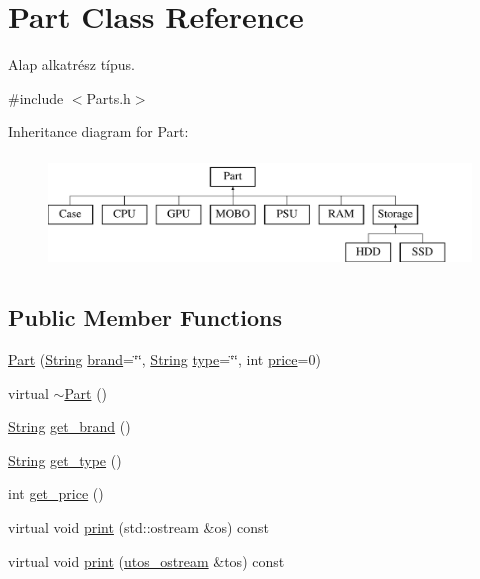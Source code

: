 \hypertarget{class_part}{}\section{Part Class Reference}
\label{class_part}


Alap alkatrész típus.  




{\ttfamily \#include $<$Parts.\+h$>$}

Inheritance diagram for Part\+:\begin{figure}[H]
\begin{center}
\leavevmode
\includegraphics[height=3.000000cm]{class_part}
\end{center}
\end{figure}
\subsection*{Public Member Functions}
\begin{DoxyCompactItemize}
\item 
\mbox{\hyperlink{class_part_aae5224ee782134c4ecb60f23ec38698f}{Part}} (\mbox{\hyperlink{class_string}{String}} \mbox{\hyperlink{class_part_ae06f2fdeb7fbbdb229a7aca151f3e341}{brand}}=\char`\"{}\char`\"{}, \mbox{\hyperlink{class_string}{String}} \mbox{\hyperlink{class_part_a101dbcc5c4b21564df7414c7eb0eae88}{type}}=\char`\"{}\char`\"{}, int \mbox{\hyperlink{class_part_a8e71223aed1da95a974f33d8d6c91bb1}{price}}=0)
\item 
virtual \mbox{\hyperlink{class_part_aaecbb747a7227f7ce3b44caeaf1801c2}{$\sim$\+Part}} ()
\item 
\mbox{\hyperlink{class_string}{String}} \mbox{\hyperlink{class_part_abdaeb1db5ba55c184f39802c163e9ebc}{get\+\_\+brand}} ()
\item 
\mbox{\hyperlink{class_string}{String}} \mbox{\hyperlink{class_part_a97117fd470cd694ae0897fb2f4391786}{get\+\_\+type}} ()
\item 
int \mbox{\hyperlink{class_part_abb7c8371883825ad46773f219db3523e}{get\+\_\+price}} ()
\item 
virtual void \mbox{\hyperlink{class_part_a4fa402b8e8fd4236ff773a7697ab2bc3}{print}} (std\+::ostream \&os) const
\item 
virtual void \mbox{\hyperlink{class_part_a9ecabe44ba3415badf82c6a23617a41e}{print}} (\mbox{\hyperlink{structutos__ostream}{utos\+\_\+ostream}} \&tos) const
\end{DoxyCompactItemize}
